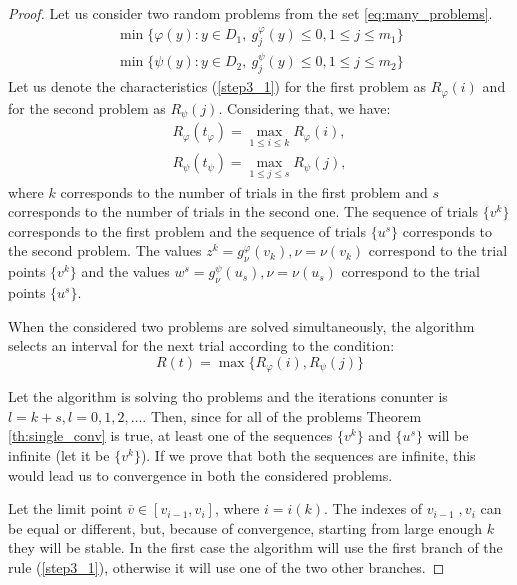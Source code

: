 \documentclass[runningheads]{llncs}
\begin{document}
\begin{proof}
  Let us consider two random problems from the set \ref{eq:many_problems}.
  \begin{equation}
      \begin{array}{lr}
        \min\{\varphi(y):y\in D_1,\: g_j^\varphi(y)\leqslant 0, 1\leqslant j\leqslant m_1\} \\
        \min\{\psi(y):y\in D_2,\: g_j^\psi(y)\leqslant 0, 1\leqslant j\leqslant m_2\}
      \end{array}
  \end{equation}
  Let us denote the characteristics (\ref{step3_1}) for the first problem as \(R_\varphi(i)\)
  and for the second problem as \(R_\psi(j)\). Considering that, we have:
  \begin{equation}
      \begin{array}{lr}
        R_\varphi(t_\varphi)=\max_{1\leqslant i\leqslant k}R_\varphi(i), \\
        R_\psi(t_\psi)=\max_{1\leqslant j\leqslant s}R_\psi(j),
      \end{array}
  \end{equation}
  where \(k\) corresponds to the number of trials in the first problem and \(s\)
  corresponds to the number of trials in the second one. The sequence of trials \(\{v^k\}\)
  corresponds to the first problem and the sequence of trials \(\{u^s\}\)
  corresponds to the second problem. The values \(z^k=g^\varphi_\nu(v_k),\nu =\nu (v_{k})\) correspond to the
  trial points \(\{v^k\}\) and the values \(w^s=g^\psi_\nu(u_s),\nu =\nu(u_{s})\) correspond to the
  trial points \(\{u^s\}\).

  When the considered two problems are solved simultaneously, the algorithm selects
  an interval for the next trial according to the condition:
  \begin{equation}
    R(t) = \max\{R_\varphi(i),R_\psi(j)\}
  \end{equation}

  Let the algorithm is solving tho problems and the iterations conunter is \(l = k + s, l=0,1,2,\dots\).
  Then, since for all of the problems Theorem \ref{th:single_conv} is true, at least one of the sequences
  \(\{v^k\}\) and \(\{u^s\}\) will be infinite (let it be \(\{v^k\}\)). If we prove that both the
  sequences are infinite, this would lead us to convergence in both the considered problems.

  Let the limit point \(\overline{v}\in [v_{i-1},v_i]\), where \(i=i(k)\). The indexes of \(v_{i-1}\;,v_i\)
  can be equal or different, but, because of convergence, starting from large enough \(k\) they will be stable.
  In the first case the algorithm will use the first branch of the rule (\ref{step3_1}), otherwise it will use
  one of the two other branches.


\end{proof}
\end{document}
